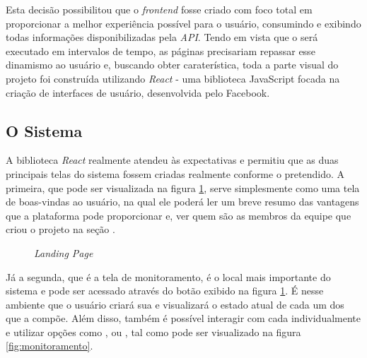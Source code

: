 Esta decisão possibilitou que o \textit{frontend} fosse criado com foco total em proporcionar a melhor experiência possível para o usuário, consumindo e exibindo todas informações disponibilizadas pela \textit{API}. Tendo em vista que o \adaptive{}será executado em intervalos de tempo, as páginas precisariam repassar esse dinamismo ao usuário e, buscando obter caraterística, toda a parte visual do projeto foi construída utilizando \textit{React} - uma biblioteca JavaScript focada na criação de interfaces de usuário, desenvolvida pelo Facebook.


\subsection{O Sistema}
\label{sec:o_sistema}

A biblioteca \textit{React} realmente atendeu às expectativas e permitiu que as duas principais telas do sistema fossem criadas realmente conforme o pretendido. A primeira, que pode ser visualizada na figura \ref{fig:landing_page}, serve simplesmente como uma tela de boas-vindas ao usuário, na qual ele poderá ler um breve resumo das vantagens que a plataforma pode proporcionar e, ver quem são as membros da equipe que criou o projeto na seção .

\begin{figure}[H]
    \centering
    \caption{\textit{Landing Page}}
    \label{fig:landing_page}
\end{figure}

Já a segunda, que é a tela de monitoramento, é o local mais importante do sistema e pode ser acessado através do botão  exibido na figura \ref{fig:landing_page}. É nesse ambiente que o usuário criará sua \dockerNetwork{} e visualizará o estado atual de cada um dos \containers{} que a compõe. Além disso, também é possível interagir com cada \conteiner{} individualmente e utilizar opções como ,  ou , tal como pode ser visualizado na figura \ref{fig:monitoramento}.

